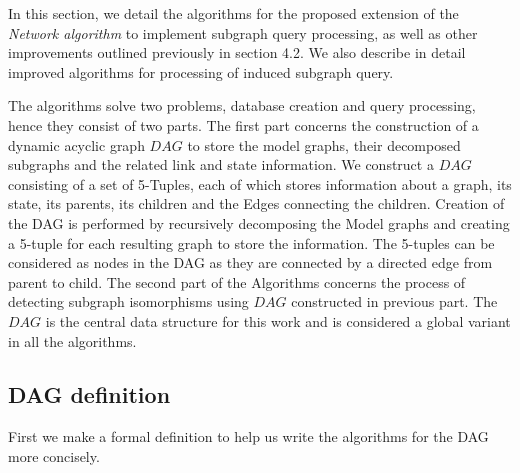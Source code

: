 In this section, we detail the algorithms for the proposed extension  of the \textit{Network algorithm} to implement subgraph query processing, as well as other improvements outlined previously in section 4.2. We also describe in detail improved algorithms for processing of induced subgraph query.


The algorithms solve two problems, database creation and query processing, hence they consist of two parts. The first part concerns the construction of a dynamic acyclic graph $DAG$ to store the model graphs, their decomposed subgraphs and the related link and state information. We construct a $DAG$ consisting of a set of 5-Tuples, each of which  stores information about a graph, its state, its parents, its children and the Edges connecting the children. Creation of the DAG is performed by recursively decomposing the Model graphs and creating a 5-tuple for each resulting graph to store the information. The 5-tuples can be considered as nodes in the DAG as they are connected by a directed edge from parent to child.
The second part of the Algorithms concerns the process of detecting subgraph isomorphisms using $DAG$ constructed in previous part. 
The $DAG$ is the central data structure for this work and is considered  a global variant in all the algorithms. 

\subsection{DAG definition}
First we make a formal definition to help us write the algorithms for the DAG more concisely.


